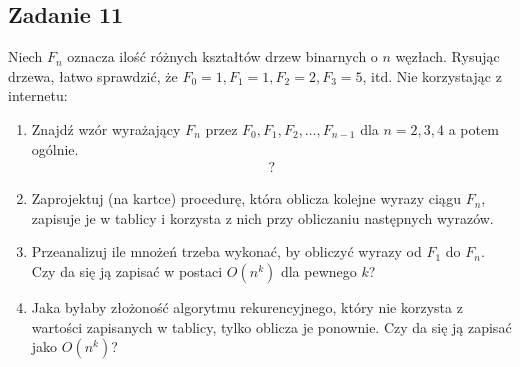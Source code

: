 \documentclass{article}
\begin{document}
\subsection*{Zadanie 11}
Niech $F_n$ oznacza ilość różnych kształtów drzew binarnych o $n$ węzłach. Rysując drzewa,
łatwo sprawdzić, że $F_0 = 1, F_1 = 1, F_2 = 2, F_3 = 5$, itd. Nie korzystając z internetu:
\begin{enumerate}[label=(\alph*)]
    \item Znajdź wzór wyrażający $F_n$ przez $F_0, F_1, F_2, \dots, F_{n-1}$ dla $n = 2, 3, 4$ a potem ogólnie.
    \begin{gather*}
        ?
    \end{gather*}
    \item Zaprojektuj (na kartce) procedurę, która oblicza kolejne wyrazy ciągu $F_n$, zapisuje
          je w tablicy i korzysta z nich przy obliczaniu następnych wyrazów.
    \item Przeanalizuj ile mnożeń trzeba wykonać, by obliczyć wyrazy od $F_1$ do $F_n$. Czy da
          się ją zapisać w postaci $O(n^k)$ dla pewnego $k$?
    \item Jaka byłaby złożoność algorytmu rekurencyjnego, który nie korzysta z wartości
          zapisanych w tablicy, tylko oblicza je ponownie. Czy da się ją zapisać jako $O(n^k)$?
\end{enumerate}
\end{document}
